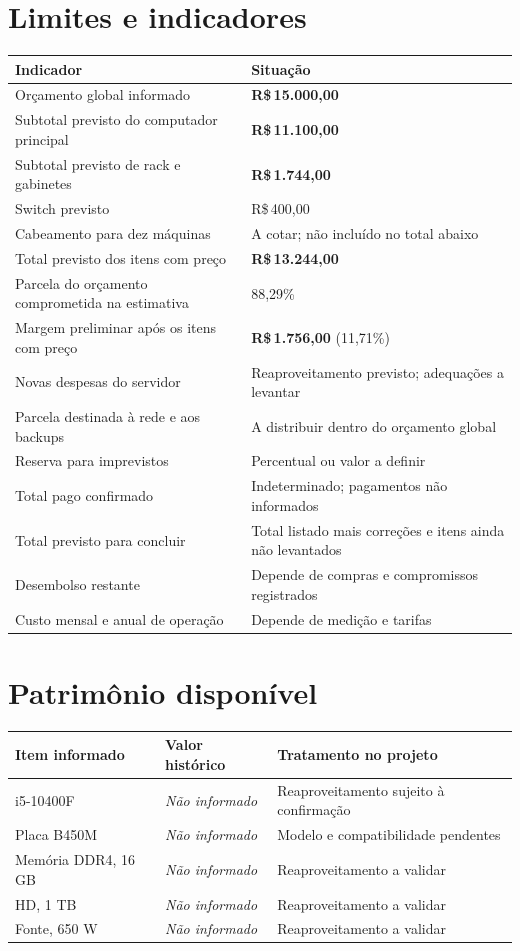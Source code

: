 \documentclass[11pt,a4paper,oneside]{report}
\newcommand{\naoinformado}{\textit{Não informado}}
\newcommand{\dinheiro}[1]{R\$\,#1}
\begin{document}
\section{Limites e indicadores}
\begin{tabularx}{\textwidth}{@{}p{6.2cm}Y@{}}
\toprule
Indicador & Situação \\
\midrule
Orçamento global informado & \textbf{\dinheiro{15.000,00}} \\
Subtotal previsto do computador principal & \textbf{\dinheiro{11.100,00}} \\
Subtotal previsto de rack e gabinetes & \textbf{\dinheiro{1.744,00}} \\
Switch previsto & \dinheiro{400,00} \\
Cabeamento para dez máquinas & A cotar; não incluído no total abaixo \\
Total previsto dos itens com preço & \textbf{\dinheiro{13.244,00}} \\
Parcela do orçamento comprometida na estimativa & 88,29\% \\
Margem preliminar após os itens com preço & \textbf{\dinheiro{1.756,00}} (11,71\%) \\
Novas despesas do servidor & Reaproveitamento previsto; adequações a levantar \\
Parcela destinada à rede e aos backups & A distribuir dentro do orçamento global \\
Reserva para imprevistos & Percentual ou valor a definir \\
Total pago confirmado & Indeterminado; pagamentos não informados \\
Total previsto para concluir & Total listado mais correções e itens ainda não levantados \\
Desembolso restante & Depende de compras e compromissos registrados \\
Custo mensal e anual de operação & Depende de medição e tarifas \\
\bottomrule
\end{tabularx}

\section{Patrimônio disponível}
\begin{tabularx}{\textwidth}{@{}p{4.3cm}p{3cm}Y@{}}
\toprule
Item informado & Valor histórico & Tratamento no projeto \\
\midrule
i5-10400F & \naoinformado & Reaproveitamento sujeito à confirmação \\
Placa B450M & \naoinformado & Modelo e compatibilidade pendentes \\
Memória DDR4, 16 GB & \naoinformado & Reaproveitamento a validar \\
HD, 1 TB & \naoinformado & Reaproveitamento a validar \\
Fonte, 650 W & \naoinformado & Reaproveitamento a validar \\
\bottomrule
\end{tabularx}
\end{document}
